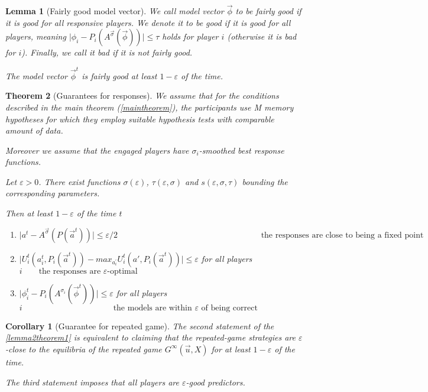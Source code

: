 \documentclass[]{spie}  %
\newtheorem{theorem}{Theorem}
\newtheorem{corollary}{Corollary}[theorem]
\newtheorem{lemma}[theorem]{Lemma}
\begin{document}
\begin{lemma}[Fairly good model vector]
\label{claim1}
We call model vector $\overrightarrow{\phi}$ to be fairly good if it is good for all responsive players. We denote it to be good if it is good for all players, meaning $\lvert \phi_i - P_i(A^{\overrightarrow{\sigma}} (\overrightarrow{\phi})) \rvert \leq \tau$ holds for player $i$ (otherwise it is bad for $i$). Finally, we call it bad if it is not fairly good.

The model vector $\overrightarrow{\phi}^t$ is fairly good at least $1-\varepsilon$ of the time.
\end{lemma}


\begin{theorem}[Guarantees for responses]
\label{lemma2theorem1}
We assume that for the conditions described in the main theorem (\autoref{maintheorem}), the participants use M memory hypotheses for which they employ suitable hypothesis tests with comparable amount of data. 

Moreover we assume that the engaged players have $\sigma_i$-smoothed best response functions.

Let $\varepsilon > 0$. There exist functions $\sigma(\varepsilon)$, $\tau(\varepsilon, \sigma)$ and $s(\varepsilon, \sigma, \tau)$ bounding the corresponding parameters.

Then at least $1 - \varepsilon$ of the time $t$
\begin{enumerate}[I]
    \item $ \lvert a^t - A^{\overrightarrow{\sigma}} (P (\overrightarrow{a}^t)) \rvert \leq \varepsilon / 2 \qquad \qquad \qquad \qquad \qquad \qquad \qquad \qquad \quad \text{  the responses are close to being a fixed point}$
    \item $ \lvert U_i^t (a_i^t, P_i(\overrightarrow{a}^t)) - max_{a^{'}_i} U_i^t(a', P_i(\overrightarrow{a}^t)) \rvert \leq \varepsilon$ for all players $i \qquad \text{the responses are } \varepsilon\text{-optimal}$
    \item $ \lvert \phi_i^t - P_i(A^{\sigma_i}(\overrightarrow{\phi}^t)) \rvert \leq \varepsilon $ for all players $i \qquad \qquad \qquad \qquad \qquad \quad  \text{the models are within } \varepsilon \text{ of being correct}$
\end{enumerate}
\end{theorem}

\begin{corollary}[Guarantee for repeated game]
\label{corepsgood}
The second statement of the \autoref{lemma2theorem1} is equivalent to claiming that the repeated-game strategies are $\varepsilon$-close to the equilibria of the repeated game $G^{\infty}(\overrightarrow{u}, X)$ for at least $1 - \varepsilon$ of the time.

The third statement imposes that all players are $\varepsilon$-good predictors.

\end{corollary}
\end{document}

